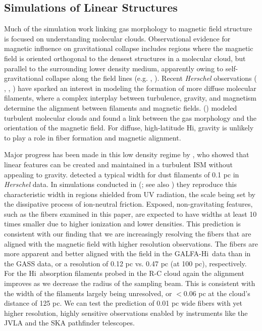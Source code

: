 \documentclass[12pt]{emulateapj}
\newcommand{\hi}{H{\sc i}~}
\newcommand{\hia}{H{\sc i}}
\newcommand{\citei}[1]{\citeauthor{#1} \citeyear{#1}}
\begin{document}
\subsection{Simulations of Linear Structures}

Much of the simulation work linking gas morphology to magnetic field structure is focused on understanding molecular clouds. Observational evidence for magnetic influence on gravitational collapse includes regions where the magnetic field is oriented orthogonal to the densest structures in a molecular cloud, but parallel to the surrounding lower density medium, apparently owing to self-gravitational collapse along the field lines (e.g. \citei{Goldsmith:2008hl}, \citei{Nakamura:2008iv}). Recent \emph{Herschel} observations (\citei{Molinari:2010hm}, \citei{Peretto:2012bu}, \citei{Andre:2010ka}) have sparked an interest in modeling the formation of more diffuse molecular filaments, where a complex interplay between turbulence, gravity, and magnetism determine the alignment between filaments and magnetic fields. \citeauthor{Soler:2013dh} (\citeyear{Soler:2013dh}) modeled turbulent molecular clouds and found a link between the gas morphology and the orientation of the magnetic field. For diffuse, high-latitude \hia, gravity is unlikely to play a role in fiber formation and magnetic alignment.

Major progress has been made in this low density regime by \cite{Hennebelle:2013ws}, who showed that linear features can be created and maintained in a turbulent ISM without appealing to gravity. \cite{Arzoumanian:2011wu} detected a typical width for dust filaments of 0.1 pc in \emph{Herschel} data. In simulations conducted in \citeauthor{Hennebelle:2013ws} (\citeyear{Hennebelle:2013ws}; see also \citei{Hennebelle:2013va}) they reproduce this characteristic width in regions shielded from UV radiation, the scale being set by the dissipative process of ion-neutral friction.  Exposed, non-gravitating features, such as the fibers examined in this paper, are expected to have widths at least 10 times smaller due to higher ionization and lower densities. This prediction is consistent with our finding that we are increasingly resolving the fibers that are aligned with the magnetic field with higher resolution observations. The fibers are more apparent and better aligned with the field in the GALFA-\hi data than in the GASS data, or a resolution of 0.12 pc vs. 0.47 pc (at 100 pc), respectively.  For the \hi absorption filaments probed in the R-C cloud again the alignment improves as we decrease the radius of the sampling beam.  This is consistent with the width of the filaments largely being unresolved, or $<0.06$ pc at the cloud's distance of 125 pc. We can test the prediction of 0.01 pc wide fibers with yet higher resolution, highly sensitive observations enabled by instruments like the JVLA and the SKA pathfinder telescopes. 
\end{document}
